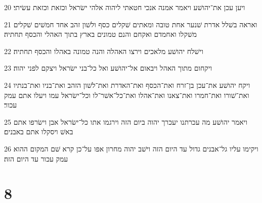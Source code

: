 \par 20 ויען עכן את־יהושׁע ויאמר אמנה אנכי חטאתי ליהוה אלהי ישׂראל וכזאת וכזאת עשׂיתי׃
\par 21 ואראה בשׁלל אדרת שׁנער אחת טובה ומאתים שׁקלים כסף ולשׁון זהב אחד חמשׁים שׁקלים משׁקלו ואחמדם ואקחם והנם טמונים בארץ בתוך האהלי והכסף תחתיה׃
\par 22 וישׁלח יהושׁע מלאכים וירצו האהלה והנה טמונה באהלו והכסף תחתיה׃
\par 23 ויקחום מתוך האהל ויבאום אל־יהושׁע ואל כל־בני ישׂראל ויצקם לפני יהוה׃
\par 24 ויקח יהושׁע את־עכן בן־זרח ואת־הכסף ואת־האדרת ואת־לשׁון הזהב ואת־בניו ואת־בנתיו ואת־שׁורו ואת־חמרו ואת־צאנו ואת־אהלו ואת־כל־אשׁר־לו וכל־ישׂראל עמו ויעלו אתם עמק עכור׃
\par 25 ויאמר יהושׁע מה עכרתנו יעכרך יהוה ביום הזה וירגמו אתו כל־ישׂראל אבן וישׂרפו אתם באשׁ ויסקלו אתם באבנים׃
\par 26 ויקימו עליו גל־אבנים גדול עד היום הזה וישׁב יהוה מחרון אפו על־כן קרא שׁם המקום ההוא עמק עכור עד היום הזה׃

\chapter{8}

